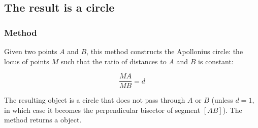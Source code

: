 \begin{minipage}{.5\textwidth}
\begin{center}
\end{center}
\end{minipage}
\begin{minipage}{.5\textwidth}
\begin{tkzexample}
\end{tkzexample}
\end{minipage}

\subsection{The result is a circle}



\subsubsection{Method }
\label{ssub:apollonius_circle_ma_mb_k}

Given two points $A$ and $B$, this method constructs the Apollonius circle: the locus of points $M$ such that the ratio of distances to $A$ and $B$ is constant:

\[
\dfrac{MA}{MB} = d
\]

\noindent
The resulting object is a circle that does not pass through $A$ or $B$ (unless $d = 1$, in which case it becomes the perpendicular bisector of segment $[AB]$). The method returns a  object.

\vspace{1em}

